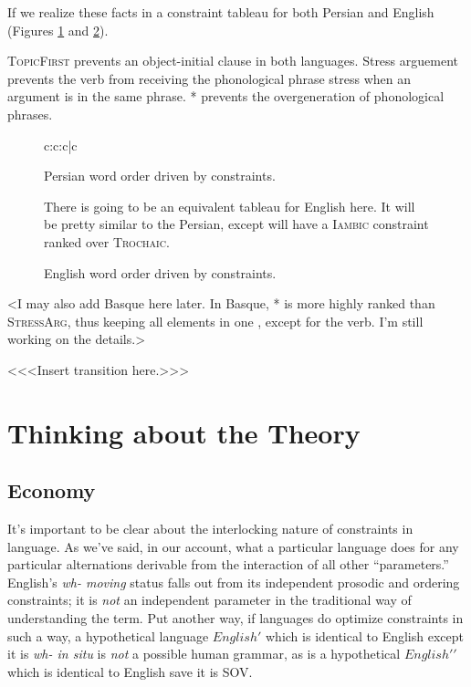 \documentclass{article}
\newcommand{\topf}{\textsc{TopicFirst}}
\newcommand{\starg}{\textsc{StressArg}}
\newcommand{\troc}{\textsc{Trochaic{\textphi}}}
\newcommand{\iamb}{\textsc{Iambic{\textphi}}}
\newcommand{\nophi}{\textsc{*{\textphi}}}
\begin{document}
If we realize these facts in a constraint tableau for both Persian and English (Figures \ref{perwo} and \ref{engwo}).

{\topf} prevents an object-initial clause in both languages. Stress arguement prevents the verb from receiving the phonological phrase stress when an argument is in the same phrase. {\nophi} prevents the overgeneration of phonological phrases.

\begin{figure}
\begin{tableau}{c:c:c|c}
\inp{}	\const{\topf}	\const{\starg}	\const{\troc}	\const{\nophi}
\cand{[ \'{S} ] [ \'O V ]}	\vio{}		\vio{}		\vio{}		\vio{**}	
\cand{[ \'S ] [ \'V O ]}	\vio{}		\vio{*!}	\vio{}		\vio{**}
\cand{[ \'S O V]}		\vio{}		\vio{*!}	\vio{}		\vio{*}
\cand{[ \'O ] [\'S V ]}		\vio{*!}	\vio{}		\vio{}		\vio{**}
\cand{[ \'S ] [ V \'O ]}	\vio{}		\vio{}		\vio{*!}	\vio{**}
\cand{[ \'S ] [ \'O ] [ \'V ]}	\vio{}		\vio{}		\vio{}		\vio{**!*}	
\end{tableau}
\caption{Persian word order driven by constraints.\label{perwo}}
\end{figure}

\begin{figure}
There is going to be an equivalent tableau for English here. It will be pretty similar to the Persian, except will have a {\iamb} constraint ranked over {\troc}.
\caption{English word order driven by constraints.\label{engwo}}
\end{figure}


<I may also add Basque here later. In Basque, {\nophi} is more highly ranked than {\starg}, thus keeping all elements in one \textphi, except for the verb. I'm still working on the details.>

<<<Insert transition here.>>>

\section{Thinking about the Theory}


\subsection{Economy}

It's important to be clear about the interlocking nature of constraints in language. As we've said, in our account, what a particular language does for any particular alternations derivable from the interaction of all other ``parameters.'' English's \textit{wh- moving} status falls out from its independent prosodic and ordering constraints; it is \emph{not} an independent parameter in the traditional way of understanding the term. Put another way, if languages do optimize constraints in such a way, a hypothetical language $English\prime$ which is identical to English except it is \textit{wh- in situ} is \emph{not} a possible human grammar, as is a hypothetical $English\prime\prime$ which is identical to English save it is SOV.
\end{document}

